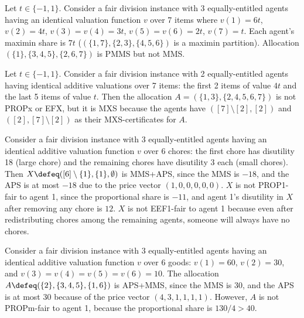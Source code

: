 \begin{example}
\label{cex:pmms-not-mms}
Let $t \in \{-1, 1\}$.
Consider a fair division instance with 3 equally-entitled agents
having an identical valuation function $v$ over 7 items where
$v(1) = 6t$, $v(2) = 4t$, $v(3) = v(4) = 3t$, $v(5) = v(6) = 2t$, $v(7) = t$.
Each agent's maximin share is $7t$ ($(\{1, 7\}, \{2, 3\}, \{4, 5, 6\})$ is a maximin partition).
Allocation $(\{1\}, \{3, 4, 5\}, \{2, 6, 7\})$ is PMMS but not MMS.
\end{example}

\begin{example}[MXS $\nfimplies$ PROPx for $n=2$]
\label{cex:mxs-not-propx-n2}
Let $t \in \{-1, 1\}$.
Consider a fair division instance with 2 equally-entitled agents
having identical additive valuations over 7 items:
the first 2 items of value $4t$ and the last 5 items of value $t$.
Then the allocation $A = (\{1, 3\}, \{2, 4, 5, 6, 7\})$ is not PROPx or EFX,
but it is MXS because the agents have $([7] \setminus [2], [2])$
and $([2], [7] \setminus [2])$ as their MXS-certificates for $A$.
\end{example}

\begin{example}
\label{cex:aps-not-prop1-chores}
Consider a fair division instance with 3 equally-entitled agents
having an identical additive valuation function $v$ over 6 chores:
the first chore has disutility 18 (large chore) and the remaining chores have disutility 3 each (small chores).
Then $X \defeq ([6] \setminus \{1\}, \{1\}, \emptyset)$ is MMS+APS,
since the MMS is $-18$, and the APS is at most $-18$ due to the price vector $(1, 0, 0, 0, 0, 0)$.
$X$ is not PROP1-fair to agent 1, since the proportional share is $-11$,
and agent 1's disutility in $X$ after removing any chore is $12$.
$X$ is not EEF1-fair to agent 1 because even after redistributing chores among the remaining agents,
someone will always have no chores.
\end{example}

\begin{example}
\label{cex:aps-not-propm}
Consider a fair division instance with 3 equally-entitled agents
having an identical additive valuation function $v$ over 6 goods:
$v(1) = 60$, $v(2) = 30$, and $v(3) = v(4) = v(5) = v(6) = 10$.
The allocation $A \defeq (\{2\}, \{3, 4, 5\}, \{1, 6\})$ is APS+MMS, since the MMS is 30,
and the APS is at most 30 because of the price vector $(4, 3, 1, 1, 1, 1)$.
However, $A$ is not PROPm-fair to agent 1, because the proportional share is $130/4 > 40$.
\end{example}

